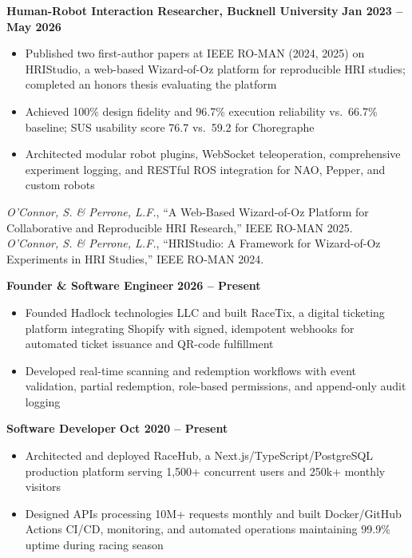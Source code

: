 \documentclass{article}
\begin{document}



\textbf{Human-Robot Interaction Researcher, Bucknell University} \hfill \textbf{Jan 2023 – May 2026}
\begin{itemize}[noitemsep,topsep=2pt]
    \item Published two first-author papers at IEEE RO-MAN (2024, 2025) on HRIStudio, a web-based Wizard-of-Oz platform for reproducible HRI studies; completed an honors thesis evaluating the platform
    \item Achieved 100\% design fidelity and 96.7\% execution reliability vs.\ 66.7\% baseline; SUS usability score 76.7 vs.\ 59.2 for Choregraphe
    \item Architected modular robot plugins, WebSocket teleoperation, comprehensive experiment logging, and RESTful ROS integration for NAO, Pepper, and custom robots
\end{itemize}
\textit{O'Connor, S. \& Perrone, L.F.}, ``A Web-Based Wizard-of-Oz Platform for Collaborative and Reproducible HRI Research,'' IEEE RO-MAN 2025.\\
\textit{O'Connor, S. \& Perrone, L.F.}, ``HRIStudio: A Framework for Wizard-of-Oz Experiments in HRI Studies,'' IEEE RO-MAN 2024.

 \hfill {}
\textbf{Founder \& Software Engineer} \hfill \textbf{2026 – Present}
\begin{itemize}[noitemsep,topsep=2pt]
    \item Founded Hadlock technologies LLC and built RaceTix, a digital ticketing platform integrating Shopify with signed, idempotent webhooks for automated ticket issuance and QR-code fulfillment
    \item Developed real-time scanning and redemption workflows with event validation, partial redemption, role-based permissions, and append-only audit logging
\end{itemize}

 \hfill {}
\textbf{Software Developer} \hfill \textbf{Oct 2020 – Present}
\begin{itemize}[noitemsep,topsep=2pt]
    \item Architected and deployed RaceHub, a Next.js/TypeScript/PostgreSQL production platform serving 1,500+ concurrent users and 250k+ monthly visitors
    \item Designed APIs processing 10M+ requests monthly and built Docker/GitHub Actions CI/CD, monitoring, and automated operations maintaining 99.9\% uptime during racing season
\end{itemize}
\end{document}
